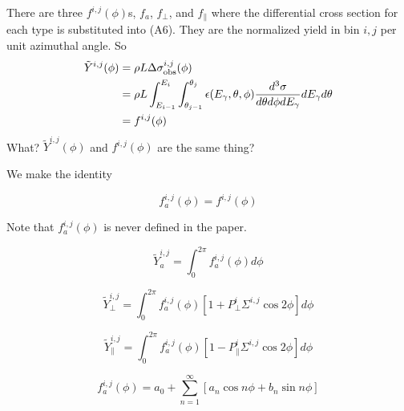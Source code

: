 \documentclass{article}
\begin{document}
There are three $f^{i,j}(\phi)$s, $f_a$, $f_\perp$, and $f_\parallel$ where the differential cross section for each type is substituted into (A6). They are the normalized yield in bin $i,j$ per unit azimuthal angle. So
\begin{equation}
  \begin{split}
    \tilde Y^{i,j}(\phi) & = \rho L\Delta\sigma^{i,j}_{\rm obs}(\phi) \\
    & = \rho L\int^{E_i}_{E_{i-1}}\int_{\theta_{j-1}}^{\theta_j} \epsilon(E_\gamma,\theta,\phi) {d^3\sigma \over d\theta d\phi dE_\gamma} dE_\gamma d\theta \\
    & = f^{i,j}(\phi)
  \end{split}
\end{equation}
What? $\tilde Y^{i,j}(\phi)$ and $f^{i,j}(\phi)$ are the same thing?

We make the identity

\begin{equation}
  f^{i,j}_a(\phi) = f^{i,j}(\phi)
\end{equation}

Note that $f^{i,j}_a(\phi)$ is never defined in the paper.

\begin{equation}
  \tilde Y^{i,j}_a = \int^{2\pi}_0 f^{i,j}_a(\phi)d\phi
  \tag{A7}
\end{equation}

\begin{equation}
  \tilde Y^{i,j}_\perp = \int^{2\pi}_0 f^{i,j}_a(\phi)[1+P^i_\perp\Sigma^{i,j}\cos2\phi]d\phi
  \tag{A8}
\end{equation}

\begin{equation}
  \tilde Y^{i,j}_\parallel = \int^{2\pi}_0 f^{i,j}_a(\phi)[1-P^i_\parallel\Sigma^{i,j}\cos2\phi]d\phi
  \tag{A9}
\end{equation}

\begin{equation}
  f^{i,j}_a(\phi) = a_0 + \sum_{n=1}^\infty [a_n \cos n\phi + b_n\sin n\phi]
  \tag{A10}
\end{equation}
\end{document}
